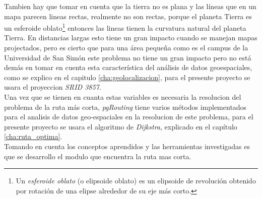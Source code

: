 Tambien hay que tomar en cuenta que la tierra no es plana y las líneas que en un mapa parecen lineas rectas, realmente no son rectas, porque el planeta Tierra es un esferoide oblato\footnote{Un \emph{esferoide oblato} (o elipsoide oblato) es un elipsoide de revolución obtenido por rotación de una elipse alrededor de su eje más corto.} entonces las lineas tienen la curvatura natural del planeta Tierra. En distancias largas esto tiene un gran impacto cuando se manejan mapas projectados, pero es cierto que para una área pequeña como es el campus de la Universidad de San Simón este problema no tiene un gran impacto pero no está demás en tomar en cuenta esta característica del análisis de datos geoespaciales, como se explico en el capitulo \ref{cha:geolocalizacion}, para el presente proyecto se usara el proyeccion \emph{SRID 3857}.\\

Una vez que se tienen en cuanta estas variables es necesaria la resolucion del problema de la ruta más corta, \emph{pgRouting} tiene varios métodos implementados para el analisis de datos geo-espaciales en la resolucion de este problema, para el presente proyecto se usara el algoritmo de \emph{Dijkstra}, explicado en el capítulo \ref{cha:ruta_optima}.\\

Tomando en cuenta los conceptos aprendidos y las herramientas investigadas es que se desarrollo el modulo que encuentra la ruta mas corta.



